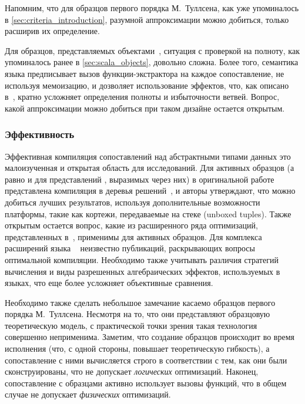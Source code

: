 Напомним, что для образцов первого порядка М.~Туллсена, как уже упоминалось в \ref{sec:criteria_introduction}, разумной аппроксимации можно добиться, только расширив их определение.

Для образцов, представляемых объектами~\cite{emir2007objects}, ситуация с проверкой на полноту, как упоминалось ранее в \ref{sec:scala_objects}, довольно сложна. Более того, семантика языка \Scala{} предписывает вызов функции-экстрактора на каждое сопоставление, не используя мемоизацию, и дозволяет использование эффектов, что, как описано в~\cite{okasaki98views}, кратно усложняет определения полноты и избыточности ветвей. Вопрос, какой аппроксимации можно добиться при таком дизайне остается открытым.

\subsubsection{Эффективность}

Эффективная компиляция сопоставлений над абстрактными типами данных это малоизученная и открытая область для исследований. Для активных образцов (а равно и для представлений \SML{}, выразимых через них) в оригинальной работе~\cite{syme2007extensible} представлена компиляция в деревья решений~\cite{scott2000whendo}, и авторы утверждают, что можно добиться лучших результатов, используя дополнительные возможности платформы, такие как кортежи, передаваемые на стеке (unboxed tuples). Также открытым остается вопрос, какие из расширенного ряда оптимизаций, представленных в~\cite{maranget2008decisiontrees}, применимы для активных образцов. Для комплекса расширений языка \Haskell~ неизвестно публикаций, раскрывающих вопросы оптимальной компиляции. Необходимо также учитывать различия стратегий вычисления и виды разрешенных алгебраических эффектов, используемых в языках, что еще более усложняет объективные сравнения.

Необходимо также сделать небольшое замечание касаемо образцов первого порядка М.~Туллсена. Несмотря на то, что они представляют образцовую теоретическую модель, с практической точки зрения такая технология совершенно неприменима. Заметим, что создание образцов происходит во время исполнения (что, с одной стороны, повышает теоретическую гибкость), а сопоставление с ними вычисляется строго в соответствии с тем, как они были сконструированы, что не допускает \textit{логических} оптимизаций. Наконец, сопоставление с образцами активно использует вызовы функций, что в общем случае не допускает \textit{физических} оптимизаций. 

